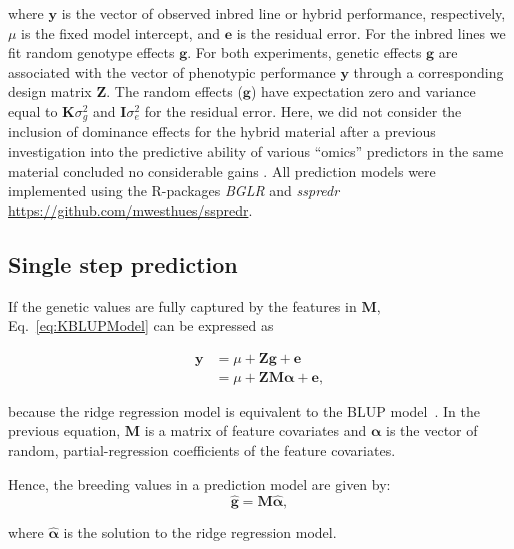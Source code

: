 \documentclass[12pt,titlepage]{article}
\begin{document}
where $\mathbf{y}$ is the vector of observed inbred line or hybrid performance,
respectively, $\mu$ is the fixed model intercept, and $\mathbf{e}$ is the 
residual error.
For the inbred lines we fit random genotype effects $\mathbf{g}$.
For both experiments, genetic effects $\mathbf{g}$ are associated with the
vector of phenotypic performance $\mathbf{y}$ through a corresponding design
matrix $\mathbf{Z}$.
The random effects ($\mathbf{g}$) have expectation zero and variance equal to
$\mathbf{K} \sigma^{2}_{g}$ and $\mathbf{I} \sigma^2_{e}$ for the residual
error.
Here, we did not consider the inclusion of dominance effects for the hybrid
material after a previous investigation into the predictive ability of various
``omics'' predictors in the same material concluded no considerable gains 
\cite{Westhues2017}.
All prediction models were implemented using the R-packages \textit{BGLR}
\cite{Perez2014} and \textit{sspredr}
\url{https://github.com/mwesthues/sspredr}.


\subsection{Single step prediction}
If the genetic values are fully captured by the features in $\mathbf{M}$,
Eq.~\ref{eq:KBLUPModel} can be expressed as

\begin{align} \label{eq:KBLUPModelSimplified}
	\mathbf{y} &= \mu + \mathbf{Z} \mathbf{g} + \boldsymbol{e} \\
	&= \mu + \mathbf{Z} \mathbf{M} \boldsymbol{\alpha} + \boldsymbol{e},
\end{align}

\cite{Fernando2014} because the ridge regression model is equivalent to the
BLUP model~\cite{Ruppert2003}.
In the previous equation, $\mathbf{M}$ is a matrix of feature covariates and
$\boldsymbol{\alpha}$ is the vector of random, partial-regression coefficients
of the feature covariates.


Hence, the breeding values in a prediction model are given by:
\begin{equation} \label{eq:mrnaebv}
	\mathbf{\hat{g}} = \mathbf{M}\boldsymbol{\hat{\alpha}},
\end{equation}

where $\boldsymbol{\hat{\alpha}}$ is the solution to the ridge regression model.
\end{document}
